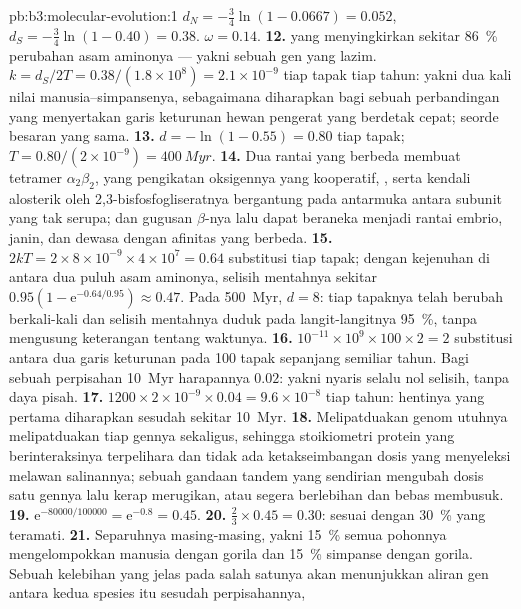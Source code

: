 \begin{solution}{pb:b3:molecular-evolution:1}
$d_{N} = -\tfrac{3}{4}\ln(1 - 0.0667) = 0.052$, $d_{S} = -\tfrac{3}{4}
\ln(1 - 0.40) = 0.38$. $\omega = 0.14$.
\textbf{12.}  yang menyingkirkan sekitar \qty{86}{\%}
perubahan asam aminonya --- yakni sebuah gen yang lazim. $k = d_{S}/2T = 0.38/(1.8\times
10^{8}) = 2.1\times 10^{-9}$ tiap tapak tiap tahun: yakni dua kali nilai
manusia--simpansenya, sebagaimana diharapkan bagi sebuah perbandingan yang menyertakan garis keturunan
hewan pengerat yang berdetak cepat; seorde besaran yang sama.
\textbf{13.} $d = -\ln(1 - 0.55) = 0.80$ tiap tapak; $T = 0.80/(2\times
10^{-9}) = \qty{400}{Myr}$.
\textbf{14.} Dua rantai yang berbeda membuat tetramer $\alpha_{2}\beta_{2}$,
yang pengikatan oksigennya yang kooperatif, , serta kendali alosterik
oleh 2,3-bisfosfogliseratnya bergantung pada antarmuka antara
subunit yang tak serupa; dan gugusan $\beta$-nya lalu dapat beraneka menjadi
rantai embrio, janin, dan dewasa dengan afinitas yang berbeda.
\textbf{15.} $2kT = 2\times 8\times 10^{-9}\times 4\times 10^{7} = 0.64$
substitusi tiap tapak; dengan kejenuhan di antara dua puluh asam aminonya,
selisih mentahnya sekitar $0.95(1 - \mathrm{e}^{-0.64/0.95}) \approx 0.47$.
Pada \qty{500}{Myr}, $d = 8$: tiap tapaknya telah berubah berkali-kali dan
selisih mentahnya duduk pada langit-langitnya \qty{95}{\%}, tanpa mengusung
keterangan tentang waktunya.
\textbf{16.} $10^{-11}\times 10^{9}\times 100\times 2 = 2$ substitusi
antara dua garis keturunan pada 100 tapak sepanjang semiliar tahun. Bagi sebuah
perpisahan \qty{10}{Myr} harapannya $0.02$: yakni nyaris selalu nol
selisih, tanpa daya pisah.
\textbf{17.} $1200\times 2\times 10^{-9}\times 0.04 = 9.6\times 10^{-8}$
tiap tahun: hentinya yang pertama diharapkan sesudah sekitar \qty{10}{Myr}.
\textbf{18.} Melipatduakan genom utuhnya melipatduakan tiap gennya sekaligus, sehingga
stoikiometri protein yang berinteraksinya terpelihara dan tidak ada ketakseimbangan
dosis yang menyeleksi melawan salinannya; sebuah gandaan tandem yang sendirian mengubah
dosis satu gennya lalu kerap merugikan, atau segera berlebihan dan
bebas membusuk.
\textbf{19.} $\mathrm{e}^{-\num{80000}/\num{100000}} = \mathrm{e}^{-0.8} = 0.45$.
\textbf{20.} $\tfrac{2}{3}\times 0.45 = 0.30$: sesuai dengan
\qty{30}{\%} yang teramati.
\textbf{21.} Separuhnya masing-masing, yakni \qty{15}{\%} semua pohonnya mengelompokkan manusia dengan
gorila dan \qty{15}{\%} simpanse dengan gorila. Sebuah kelebihan yang jelas pada salah satunya
akan menunjukkan aliran gen antara kedua spesies itu sesudah perpisahannya,

\end{solution}
